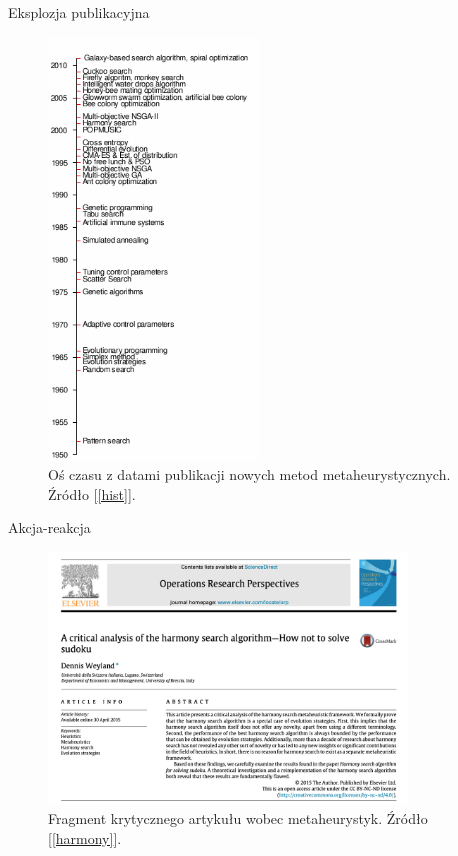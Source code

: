\documentclass[slidescentered]{beamer}
\begin{document}
\begin{frame}{Eksplozja publikacyjna}
	\begin{figure}[H]
	\centering
	\includegraphics[width=0.5\textwidth, height=0.7\textheight]{./meta-algs.png}
	\caption{Oś czasu z datami publikacji nowych metod metaheurystycznych. Źródło [\ref{hist}].}
	\end{figure}
\end{frame}

\begin{frame}{Akcja-reakcja}

\begin{figure}[H]
	\centering
	\includegraphics[width=0.85\textwidth, height=0.5\textheight]{./critic.png}
	\caption{Fragment krytycznego artykułu wobec metaheurystyk. Źródło [\ref{harmony}].}
\end{figure}

\end{frame}
\end{document}
